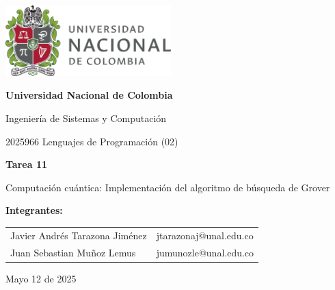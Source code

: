 \documentclass{article}
\begin{document}
\begin{titlepage}
    \centering
    \includegraphics[width=0.48\textwidth]{logo_universidad.png}
    \par\vspace{2cm}

    {\Large \textbf{Universidad Nacional de Colombia} \par}
    \vspace{0.5cm}
    {\large Ingeniería de Sistemas y Computación \par}
    {\large 2025966 Lenguajes de Programación (02)\par}
    \vspace{3cm}
    {\large \textbf{Tarea 11} \par}
    {\large Computación cuántica: Implementación del algoritmo de búsqueda de Grover \par}
    \vspace{3cm}
    {\large \textbf{Integrantes:} \par}
    \vspace{0.5cm}
    \begin{tabular}{ll}
    Javier Andrés Tarazona Jiménez & jtarazonaj@unal.edu.co \\
    Juan Sebastian Muñoz Lemus & jumunozle@unal.edu.co \\
    \end{tabular}
    \par\vspace{3cm}

    {\large Mayo 12 de 2025 \par}
\end{titlepage}

\tableofcontents %

\newpage %


\end{document}
